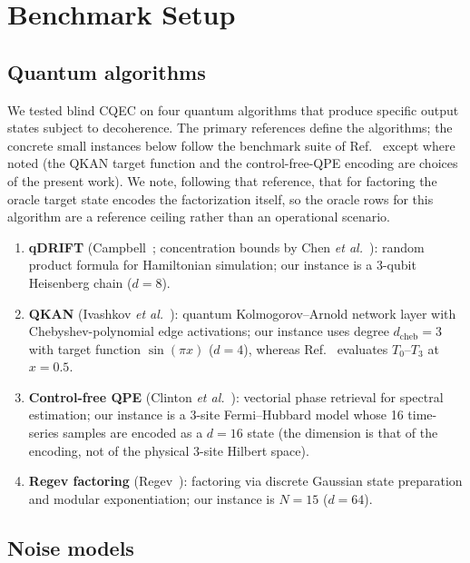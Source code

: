 \documentclass[12pt,a4paper]{article}
\begin{document}
\section{Benchmark Setup}
\label{sec:setup}

\subsection{Quantum algorithms}
\label{sec:algorithms}

We tested blind CQEC on four quantum algorithms that produce specific output states subject to decoherence. The primary references define the algorithms; the concrete small instances below follow the benchmark suite of Ref.~\cite[Sec.~5]{Wakaura2026unified} except where noted (the QKAN target function and the control-free-QPE encoding are choices of the present work). We note, following that reference, that for factoring the oracle target state encodes the factorization itself, so the oracle rows for this algorithm are a reference ceiling rather than an operational scenario.

\begin{enumerate}
\item \textbf{qDRIFT} (Campbell~\cite{Campbell2019}; concentration bounds by Chen \emph{et al.}~\cite{Chen2021}): random product formula for Hamiltonian simulation; our instance is a 3-qubit Heisenberg chain ($d = 8$).
\item \textbf{QKAN} (Ivashkov \emph{et al.}~\cite{Ivashkov2024}): quantum Kolmogorov--Arnold network layer with Chebyshev-polynomial edge activations; our instance uses degree $d_\mathrm{cheb} = 3$ with target function $\sin(\pi x)$ ($d = 4$), whereas Ref.~\cite{Wakaura2026unified} evaluates $T_0$--$T_3$ at $x = 0.5$.
\item \textbf{Control-free QPE} (Clinton \emph{et al.}~\cite{Clinton2026}): vectorial phase retrieval for spectral estimation; our instance is a 3-site Fermi--Hubbard model whose 16 time-series samples are encoded as a $d = 16$ state (the dimension is that of the encoding, not of the physical 3-site Hilbert space).
\item \textbf{Regev factoring} (Regev~\cite{Regev2024}): factoring via discrete Gaussian state preparation and modular exponentiation; our instance is $N = 15$ ($d = 64$).
\end{enumerate}

\subsection{Noise models}
\label{sec:noise}
\end{document}
